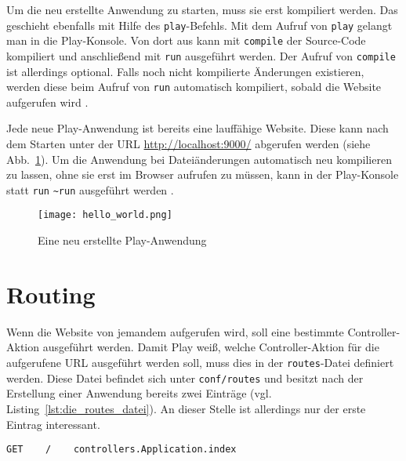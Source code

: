 Um die neu erstellte Anwendung zu starten, muss sie erst kompiliert werden.
Das geschieht ebenfalls mit Hilfe des \lstinline|play|-Befehls.
Mit dem Aufruf von \lstinline|play| gelangt man in die Play-Konsole.
Von dort aus kann mit \lstinline|compile| der Source-Code kompiliert und anschließend mit \lstinline|run| ausgeführt werden.
Der Aufruf von \lstinline|compile| ist allerdings optional.
Falls noch nicht kompilierte Änderungen existieren, werden diese beim Aufruf von \lstinline|run| automatisch kompiliert, sobald die Website aufgerufen wird \cite[vgl.][]{play_compile}.

Jede neue Play-Anwendung ist bereits eine lauffähige Website.
Diese kann nach dem Starten unter der URL \url{http://localhost:9000/} abgerufen werden (siehe Abb.~\ref{fig:anwendung_nach_erstellung}).
Um die Anwendung bei Dateiänderungen automatisch neu kompilieren zu lassen, ohne sie erst im Browser aufrufen zu müssen, kann in der Play-Konsole statt \lstinline|run| \lstinline|~run| ausgeführt werden \cite[vgl.][S.~12--13]{play_for_scala_v8}.

\begin{figure}
\centering
\texttt{[image: hello\_world.png]}
\caption{Eine neu erstellte Play-Anwendung}
\label{fig:anwendung_nach_erstellung}
\end{figure}



\section{Routing} %
\label{sec:routing}

Wenn die Website von jemandem aufgerufen wird, soll eine bestimmte Controller-Aktion ausgeführt werden.
Damit Play weiß, welche Controller-Aktion für die aufgerufene URL ausgeführt werden soll, muss dies in der \lstinline|routes|-Datei definiert werden.
Diese Datei befindet sich unter \lstinline|conf/routes| und besitzt nach der Erstellung einer Anwendung bereits zwei Einträge (vgl. Listing~\ref{lst:die_routes_datei}).
An dieser Stelle ist allerdings nur der erste Eintrag interessant.

\begin{lstlisting}[caption=Die routes-Datei, label=lst:die_routes_datei]
  GET    /    controllers.Application.index
\end{lstlisting}

